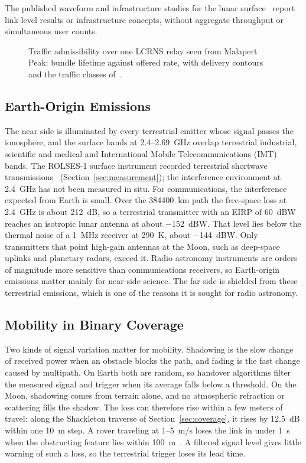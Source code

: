 \documentclass{IEEEoj}
\begin{document}
The published waveform and infrastructure studies for the lunar surface~\cite{jia_waveform,beacon_demo} report link-level results or infrastructure concepts, without aggregate throughput or simultaneous user counts.

\begin{figure}[!t]
\centering

\caption{Traffic admissibility over one LCRNS relay seen from Malapert Peak: bundle lifetime against offered rate, with delivery contours and the traffic classes of~\cite{baena2027lunabridge}.}
\label{fig:dutycycle}
\end{figure}

\subsection{Earth-Origin Emissions}
The near side is illuminated by every terrestrial emitter whose signal passes the ionosphere, and the surface bands at \SI{2.4}{}--\SI{2.69}{GHz} overlap terrestrial industrial, scientific and medical and International Mobile Telecommunications (IMT) bands. The ROLSES-1 surface instrument recorded terrestrial shortwave transmissions~\cite{hibbard_rolses2025} (Section~\ref{sec:measurement}); the interference environment at \SI{2.4}{GHz} has not been measured in situ. For communications, the interference expected from Earth is small. Over the \SI{384400}{km} path the free-space loss at \SI{2.4}{GHz} is about \SI{212}{dB}, so a terrestrial transmitter with an EIRP of \SI{60}{dBW} reaches an isotropic lunar antenna at about \SI{-152}{dBW}. That level lies below the thermal noise of a \SI{1}{MHz} receiver at \SI{290}{K}, about \SI{-144}{dBW}. Only transmitters that point high-gain antennas at the Moon, such as deep-space uplinks and planetary radars, exceed it. Radio astronomy instruments are orders of magnitude more sensitive than communications receivers, so Earth-origin emissions matter mainly for near-side science. The far side is shielded from these terrestrial emissions, which is one of the reasons it is sought for radio astronomy.

\subsection{Mobility in Binary Coverage}
\label{sec:mobility}

Two kinds of signal variation matter for mobility. Shadowing is the slow change of received power when an obstacle blocks the path, and fading is the fast change caused by multipath. On Earth both are random, so handover algorithms filter the measured signal and trigger when its average falls below a threshold. On the Moon, shadowing comes from terrain alone, and no atmospheric refraction or scattering fills the shadow. The loss can therefore rise within a few meters of travel: along the Shackleton traverse of Section~\ref{sec:coverage}, it rises by \SI{12.5}{dB} within one \SI{10}{m} step. A rover traveling at \SI{1}{}--\SI{5}{m/s} loses the link in under \SI{1}{\second} when the obstructing feature lies within \SI{100}{m}~\cite{azami_terrain_aware}. A filtered signal level gives little warning of such a loss, so the terrestrial trigger loses its lead time.
\end{document}
